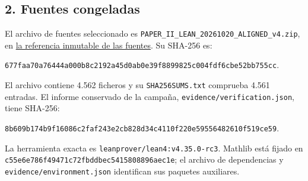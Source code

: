 \documentclass[spanish,11pt,a4paper]{article}
\begin{document}
\subsection{2. Fuentes congeladas}\label{fuentes-congeladas}

El archivo de fuentes seleccionado es \texttt{PAPER\_\allowbreak{}II\_\allowbreak{}LEA\allowbreak{}N\_\allowbreak{}20261020\_\allowbreak{}A\allowbreak{}LIGNED\_\allowbreak{}v4.\allowbreak{}zi\allowbreak{}p}, en \href{https://github.com/jtraverso/nash-williams-triangle-decompositions-release/blob/d6d020982ebf3f3cd8c104b6befc6c094850b3e7/archives/PAPER_II_LEAN_20261020_ALIGNED_v4.zip}{la referencia inmutable de las fuentes}. Su SHA-256 es:

\texttt{677faa70\allowbreak{}a764\allowbreak{}44a0\allowbreak{}00b8c219\allowbreak{}\allowbreak{}2a45d0ab\allowbreak{}0e39\allowbreak{}f889\allowbreak{}9825c004\allowbreak{}\allowbreak{}fdf6cbe5\allowbreak{}2bb7\allowbreak{}55cc\allowbreak{}}.

El archivo contiene 4.562 ficheros y su \texttt{SHA256SUMS.\allowbreak{}t\allowbreak{}xt} comprueba 4.561 entradas. El informe conservado de la campaña, \texttt{evidence/\allowbreak{}ver\allowbreak{}ification.\allowbreak{}js\allowbreak{}on}, tiene SHA-256:

\texttt{8b609b17\allowbreak{}4b9f\allowbreak{}1608\allowbreak{}6c2faf24\allowbreak{}\allowbreak{}3e2cb828\allowbreak{}d34c\allowbreak{}4110\allowbreak{}f220e595\allowbreak{}\allowbreak{}56482610\allowbreak{}f519\allowbreak{}ce59\allowbreak{}}.

La herramienta exacta es \texttt{leanprover/\allowbreak{}l\allowbreak{}ean4:v4.\allowbreak{}35.\allowbreak{}0\allowbreak{}-\allowbreak{}rc3}. Mathlib está fijado en \texttt{c55e6e78\allowbreak{}6f49\allowbreak{}471c\allowbreak{}72fbddbe\allowbreak{}\allowbreak{}c5415808\allowbreak{}896a\allowbreak{}ec1e\allowbreak{}}; el archivo de dependencias y \texttt{evidence/\allowbreak{}env\allowbreak{}ironment.\allowbreak{}jso\allowbreak{}n} identifican sus paquetes auxiliares.
\end{document}
